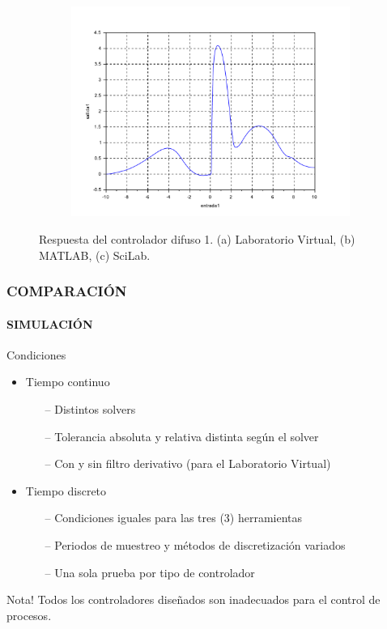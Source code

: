 \documentclass[usenames,xcolor={dvipsnames, table}]{beamer}
\begin{document}
\begin{frame}
\begin{figure}[htb]
\begin{subfigure}[t]{0.32\textwidth}
			\caption{}
		\end{subfigure}
		\hfill
		\begin{subfigure}[t]{0.32\textwidth}
			\centering
			\includegraphics[width=\textwidth]{imagenes/SciLabTomoC1.pdf}
			\caption{}
		\end{subfigure}
		\caption{Respuesta del controlador difuso 1. (a) Laboratorio Virtual, (b) MATLAB, (c) SciLab.}
	\end{figure}

\end{frame}

\begin{frame}
	\frametitle{COMPARACIÓN}
	\framesubtitle{SIMULACIÓN}
	\vspace{20pt}
	\begin{block}{Condiciones}
		\begin{itemize}
			\item Tiempo continuo
			\begin{itemize}
				\item[--] Distintos solvers
				\item[--] Tolerancia absoluta y relativa distinta según el solver
				\item[--] Con y sin filtro derivativo (para el Laboratorio Virtual)
			\end{itemize}
			\item Tiempo discreto
			\begin{itemize}
				\item[--] Condiciones iguales para las tres (3) herramientas
				\item[--] Periodos de muestreo y métodos de discretización variados
				\item[--] Una sola prueba por tipo de controlador
			\end{itemize}
		\end{itemize}
	\end{block}

	\begin{alertblock}{Nota!}
		Todos los controladores diseñados son inadecuados para el control de procesos.
	\end{alertblock}

\end{frame}
\end{document}
